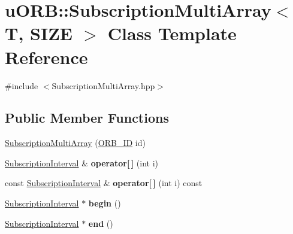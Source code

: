 \hypertarget{classuORB_1_1SubscriptionMultiArray}{}\section{u\+O\+RB\+:\+:Subscription\+Multi\+Array$<$ T, S\+I\+ZE $>$ Class Template Reference}
\label{classuORB_1_1SubscriptionMultiArray}


{\ttfamily \#include $<$Subscription\+Multi\+Array.\+hpp$>$}

\subsection*{Public Member Functions}
\begin{DoxyCompactItemize}
\item 
\hyperlink{classuORB_1_1SubscriptionMultiArray_a36aea582175575ace4386505434670af}{Subscription\+Multi\+Array} (\hyperlink{uORB_8h_a96af5434ec1acdf24287bd7851b0413f}{O\+R\+B\+\_\+\+ID} id)
\item 
\mbox{\label{classuORB_1_1SubscriptionMultiArray_a964f7886e2be21d493f6d107cb85704c}} 
\hyperlink{classuORB_1_1SubscriptionInterval}{Subscription\+Interval} \& {\bfseries operator\mbox{[}$\,$\mbox{]}} (int i)
\item 
\mbox{\label{classuORB_1_1SubscriptionMultiArray_a97ad1750e9cff53806105e1f73ec91fd}} 
const \hyperlink{classuORB_1_1SubscriptionInterval}{Subscription\+Interval} \& {\bfseries operator\mbox{[}$\,$\mbox{]}} (int i) const
\item 
\mbox{\label{classuORB_1_1SubscriptionMultiArray_aea5115f1dc015ee12bfcdbee8cdcfa14}} 
\hyperlink{classuORB_1_1SubscriptionInterval}{Subscription\+Interval} $\ast$ {\bfseries begin} ()
\item 
\mbox{\label{classuORB_1_1SubscriptionMultiArray_ad17e83d98526f4d2376688e20fadb0bb}} 
\hyperlink{classuORB_1_1SubscriptionInterval}{Subscription\+Interval} $\ast$ {\bfseries end} ()
\item 
\mbox{\label{classuORB_1_1SubscriptionMultiArray_a519d1832a1dcd343716a765021359021}} 

\end{DoxyCompactItemize}
